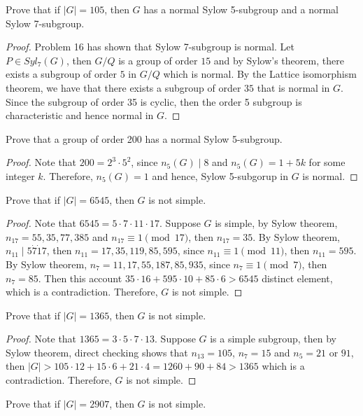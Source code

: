 \documentclass{article}
\newenvironment{problem}[2][Problem]{\begin{trivlist}
\item[\hskip \labelsep {\bfseries #1}\hskip \labelsep {\bfseries #2.}]}{\end{trivlist}}
\begin{document}
\begin{problem}{17}
     Prove that if $|G| = 105$, then $G$ has a normal Sylow 5-subgroup and a normal Sylow 7-subgroup.
\end{problem}
\begin{proof}
    Problem 16 has shown that Sylow 7-subgroup is normal. Let $P\in Syl_7(G)$, then $G/Q$ is a group of order $15$ and by Sylow's theorem, there exists a subgroup of order $5$ in $G/Q$ which is normal. By the Lattice isomorphism theorem, we have that there exists a subgroup of order $35$ that is normal in $G$. Since the subgroup of order 35 is cyclic, then the order 5 subgroup is characteristic and hence normal in $G$.
\end{proof}
\begin{problem}{18}
     Prove that a group of order 200 has a normal Sylow 5-subgroup.
\end{problem}
\begin{proof}
    Note that $200=2^3\cdot 5^2$, since $n_5(G)\mid 8$ and $n_5(G)=1+5k$ for some integer $k$. Therefore, $n_5(G)=1$ and hence, Sylow 5-subgorup in $G$ is normal. 
\end{proof}
\begin{problem}{19}
     Prove that if $|G| = 6545$, then $G$ is not simple.
\end{problem}
\begin{proof}
    Note that $6545 = 5 \cdot 7 \cdot 11 \cdot 17$. Suppose $G$ is simple, by Sylow theorem, $n_{17}=55, 35, 77, 385$ and $n_{17}\equiv 1 \pmod {17}$, then $n_{17}=35$. By Sylow theorem, $n_{11}\mid 5 \dot 7 \dot 17$, then $n_{11}=17, 35, 119, 85, 595$, since $n_{11}\equiv 1 \pmod{11}$, then $n_{11}=595$. By Sylow theorem, $n_{7}=11, 17, 55, 187, 85, 935$, since $n_7 \equiv 1 \pmod {7}$, then $n_7=85$. Then this account $35\cdot 16+595 \cdot 10+85\cdot 6>6545$ distinct element, which is a contradiction. Therefore, $G$ is not simple.
\end{proof}
\begin{problem}{20}
 Prove that if $|G| = 1365$, then $G$ is not simple.
\end{problem}
\begin{proof}
    Note that $1365 = 3\cdot 5\cdot 7\cdot 13$. Suppose $G$ is a simple subgroup, then by Sylow theorem, direct checking shows that $n_{13} = 105$, $n_{7}=15$ and $n_5=21$ or $91$, then $|G|>105\cdot 12 + 15 \cdot 6 + 21 \cdot 4 = 1260+90+84>1365$ which is a contradiction. Therefore, $G$ is not simple.
\end{proof}
\begin{problem}{21}
     Prove that if $|G| = 2907$, then $G$ is not simple.
\end{problem}
\end{document}
